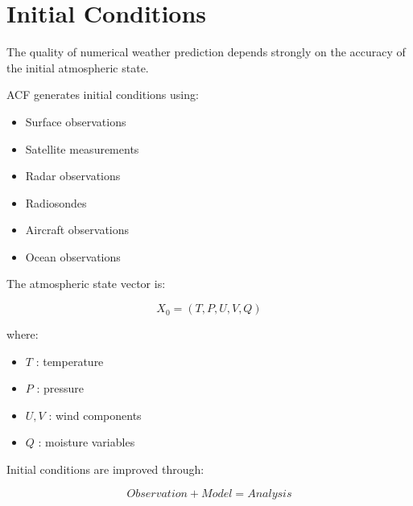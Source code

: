 \section{Initial Conditions}


The quality of numerical weather prediction depends strongly on
the accuracy of the initial atmospheric state.



ACF generates initial conditions using:


\begin{itemize}

\item Surface observations

\item Satellite measurements

\item Radar observations

\item Radiosondes

\item Aircraft observations

\item Ocean observations

\end{itemize}



The atmospheric state vector is:


\[
X_0 =
(T,P,U,V,Q)
\]


where:


\begin{itemize}

\item $T$ : temperature

\item $P$ : pressure

\item $U,V$ : wind components

\item $Q$ : moisture variables

\end{itemize}



Initial conditions are improved through:


\[
Observation
+
Model
=
Analysis
\]

